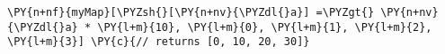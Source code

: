\begin{Verbatim}[commandchars=\\\{\}]
\PY{n+nf}{myMap}[\PYZsh{}[\PY{n+nv}{\PYZdl{}a}] =\PYZgt{} \PY{n+nv}{\PYZdl{}a} * \PY{l+m}{10}, \PY{l+m}{0}, \PY{l+m}{1}, \PY{l+m}{2}, \PY{l+m}{3}] \PY{c}{// returns [0, 10, 20, 30]}
\end{Verbatim}

